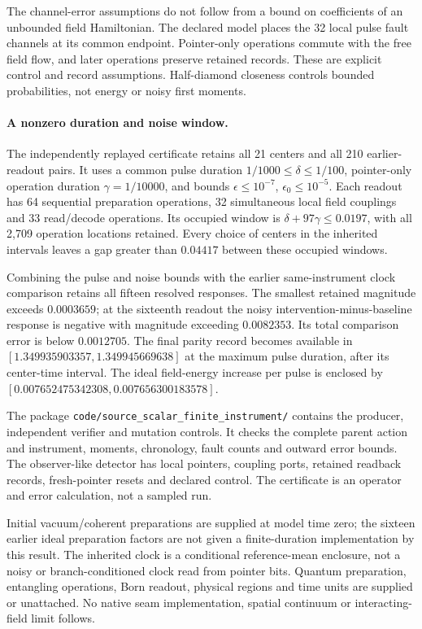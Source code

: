 The channel-error assumptions do not follow from a bound on coefficients of
an unbounded field Hamiltonian. The declared model places the 32 local pulse
fault channels at its common endpoint. Pointer-only operations commute with
the free field flow, and later operations preserve retained records.
These are explicit control and record assumptions. Half-diamond closeness
controls bounded probabilities, not energy or noisy first moments.

\paragraph{A nonzero duration and noise window.}
The independently replayed certificate retains all 21 centers and all 210
earlier-readout pairs. It uses a common pulse duration
$1/1000\le\delta\le1/100$, pointer-only operation duration
$\gamma=1/10000$, and bounds
$\epsilon\le10^{-7}$, $\epsilon_0\le10^{-5}$.
Each readout has 64 sequential preparation operations, 32 simultaneous
local field couplings and 33 read/decode operations. Its occupied window
is $\delta+97\gamma\le0.0197$, with all 2,709 operation locations retained.
Every choice of centers in the inherited intervals leaves a gap greater
than $0.04417$ between these occupied windows.

Combining the pulse and noise bounds with the earlier same-instrument
clock comparison retains all fifteen resolved responses. The smallest
retained magnitude exceeds $0.0003659$; at the sixteenth readout the noisy
intervention-minus-baseline response is negative with magnitude exceeding
$0.0082353$. Its total comparison error is below $0.0012705$.
The final parity record becomes available in
$[1.349935903357,1.349945669638]$ at the maximum pulse duration, after its
center-time interval. The ideal field-energy increase per pulse is enclosed
by $[0.007652475342308,0.007656300183578]$.

The package \texttt{code/source\_scalar\_finite\_instrument/} contains the
producer, independent verifier and mutation controls. It checks the complete
parent action and instrument, moments, chronology, fault counts and outward
error bounds. The observer-like detector has local pointers, coupling ports,
retained readback records, fresh-pointer resets and declared control. The
certificate is an operator and error calculation, not a sampled run.

Initial vacuum/coherent preparations are supplied at model time zero; the
sixteen earlier ideal preparation factors are not given a finite-duration
implementation by this result. The inherited clock is a conditional
reference-mean enclosure, not a noisy or branch-conditioned clock read from
pointer bits. Quantum preparation, entangling operations, Born readout,
physical regions and time units are supplied or unattached. No native
seam implementation, spatial continuum or interacting-field limit follows.
